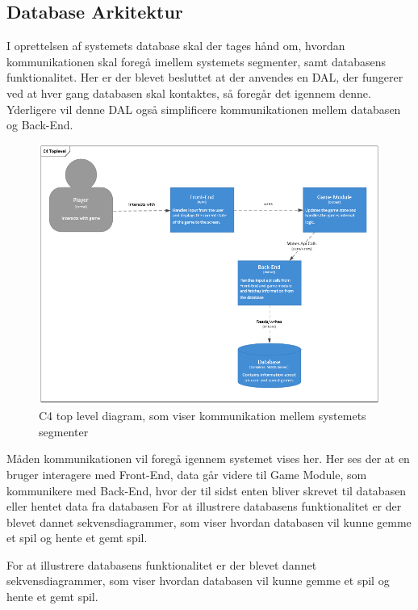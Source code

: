 \subsection{Database Arkitektur}

I oprettelsen af systemets database skal der tages hånd om, hvordan kommunikationen skal foregå imellem systemets segmenter, samt databasens funktionalitet. Her er der blevet besluttet at der anvendes en DAL, der fungerer ved at hver gang databasen skal kontaktes, så foregår det igennem denne. Yderligere vil denne DAL også simplificere kommunikationen mellem databasen og Back-End.

\begin{figure}[H]
\centering
\includegraphics[width = \textwidth]{02-Body/Images/C4TopLvlDB}
\caption{C4 top level diagram, som viser kommunikation mellem systemets segmenter}
\label{fig:C4TopLvlDB}
\end{figure}

Måden kommunikationen vil foregå igennem systemet vises her. Her ses der at en bruger interagere med Front-End, data går videre til Game Module, som kommunikere med Back-End, hvor der til sidst enten bliver skrevet til databasen eller hentet data fra databasen
For at illustrere databasens funktionalitet er der blevet dannet sekvensdiagrammer, som viser hvordan databasen vil kunne gemme et spil og hente et gemt spil.

For at illustrere databasens funktionalitet er der blevet dannet sekvensdiagrammer, som viser hvordan databasen vil kunne gemme et spil og hente et gemt spil.

